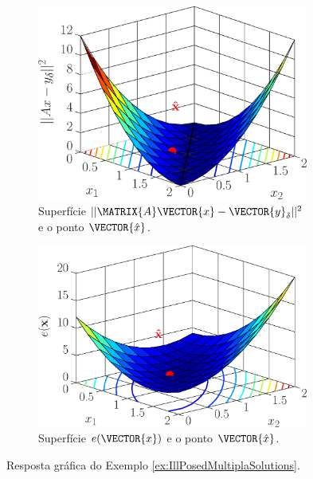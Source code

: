 \begin{figure}[h!]
     \centering
     \begin{subfigure}[b]{0.475\textwidth}
         \centering
         \includegraphics[width=0.98\textwidth]{chapters/notacao/mfiles/illpossed2/surfcaxyd.eps}
         \caption{Superfície $||\MATRIX{A}\VECTOR{x}-\VECTOR{y}_{\delta}||^2$ e o ponto $\VECTOR{\hat{x}}$.}
         \label{fig:ex:IllPosedMultiplaSolutions:a}
     \end{subfigure}
     \hfill
     \begin{subfigure}[b]{0.475\textwidth}
         \centering
         \includegraphics[width=0.98\textwidth]{chapters/notacao/mfiles/illpossed2/surfcex.eps}
         \caption{Superfície $e(\VECTOR{x})$ e o ponto $\VECTOR{\hat{x}}$. }
         \label{fig:ex:IllPosedMultiplaSolutions:b}
     \end{subfigure}
        \caption{Resposta gráfica do Exemplo \ref{ex:IllPosedMultiplaSolutions}. }
        \label{fig:ex:IllPosedMultiplaSolutions}
\end{figure}

